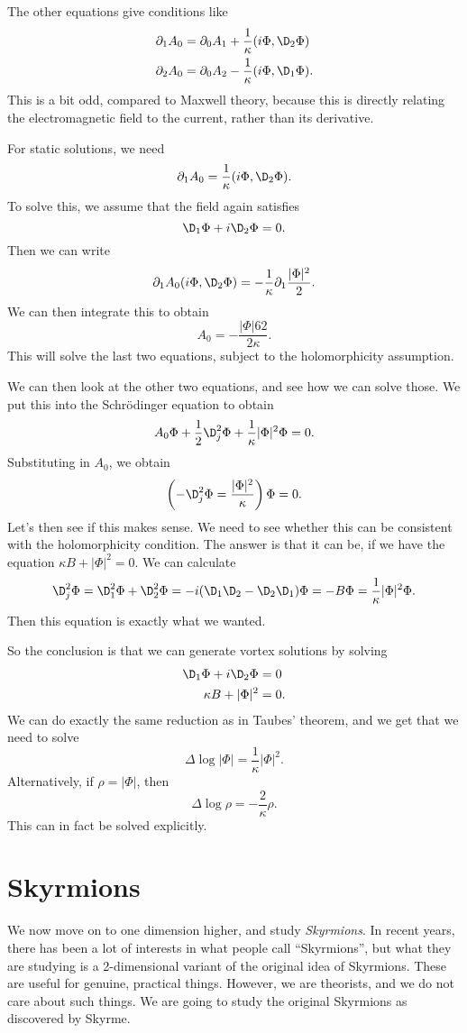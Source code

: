 \documentclass[a4paper]{article}
\begin{document}
The other equations give conditions like
\begin{align*}
  \partial_1 A_0 &= \partial_0 A_1 + \frac{1}{\kappa} (i \Phi, \D_2 \Phi)\\
  \partial_2 A_0 &= \partial_0 A_2 - \frac{1}{\kappa} (i \Phi, \D_1 \Phi).
\end{align*}
This is a bit odd, compared to Maxwell theory, because this is directly relating the electromagnetic field to the current, rather than its derivative.

For static solutions, we need
\[
  \partial_1 A_0 = \frac{1}{\kappa} (i \Phi, \D_2 \Phi).
\]
To solve this, we assume that the field again satisfies
\[
  \D_1 \Phi + i \D_2 \Phi = 0.
\]
Then we can write
\[
  \partial_1 A_0 (i \Phi, \D_2 \Phi) = - \frac{1}{\kappa} \partial_1 \frac{|\Phi|^2}{2}.
\]
We can then integrate this to obtain
\[
  A_0 = -\frac{|\Phi|62}{ 2 \kappa}.
\]
This will solve the last two equations, subject to the holomorphicity assumption.

We can then look at the other two equations, and see how we can solve those. We put this into the Schr\"odinger equation to obtain
\[
  A_0 \Phi + \frac{1}{2} \D_j^2 \Phi + \frac{1}{\kappa} |\Phi|^2 \Phi = 0.
\]
Substituting in $A_0$, we obtain
\[
  \left(- \D_j^2 \Phi = \frac{|\Phi|^2}{\kappa} \right)\Phi = 0.
\]
Let's then see if this makes sense. We need to see whether this can be consistent with the holomorphicity condition. The answer is that it can be, if we have the equation $\kappa B + |\Phi|^2 = 0$. We can calculate
\[
  \D_j^2 \Phi = \D_1^2 \Phi + \D_2^2 \Phi = -i (\D_1 \D_2 - \D_2 \D_1) \Phi = - B \Phi = \frac{1}{\kappa} |\Phi|^2 \Phi.
\]
Then this equation is exactly what we wanted.

So the conclusion is that we can generate vortex solutions by solving
\begin{align*}
  \D_1 \Phi + i \D_2 \Phi &= 0\\
  \kappa B + |\Phi|^2 &= 0.
\end{align*}
We can do exactly the same reduction as in Taubes' theorem, and we get that we need to solve
\[
  \Delta \log |\Phi| = \frac{1}{\kappa} |\Phi|^2.
\]
Alternatively, if $\rho = |\Phi|$, then
\[
  \Delta \log \rho = - \frac{2}{\kappa}\rho.
\]
This can in fact be solved explicitly.

\section{Skyrmions}

We now move on to one dimension higher, and study \emph{Skyrmions}. In recent years, there has been a lot of interests in what people call ``Skyrmions'', but what they are studying is a 2-dimensional variant of the original idea of Skyrmions. These are useful for genuine, practical things. However, we are theorists, and we do not care about such things. We are going to study the original Skyrmions as discovered by Skyrme.
\end{document}
